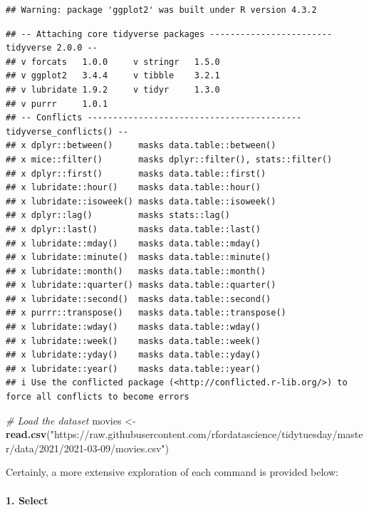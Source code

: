 \documentclass[
  b5paper]{book}
\newenvironment{Shaded}{\begin{snugshade}}{\end{snugshade}}
\newcommand{\CommentTok}[1]{\textcolor[rgb]{0.56,0.35,0.01}{\textit{#1}}}
\newcommand{\FunctionTok}[1]{\textcolor[rgb]{0.13,0.29,0.53}{\textbf{#1}}}
\newcommand{\NormalTok}[1]{#1}
\newcommand{\OtherTok}[1]{\textcolor[rgb]{0.56,0.35,0.01}{#1}}
\newcommand{\StringTok}[1]{\textcolor[rgb]{0.31,0.60,0.02}{#1}}
\begin{document}
\begin{verbatim}
## Warning: package 'ggplot2' was built under R version 4.3.2
\end{verbatim}

\begin{verbatim}
## -- Attaching core tidyverse packages ------------------------ tidyverse 2.0.0 --
## v forcats   1.0.0     v stringr   1.5.0
## v ggplot2   3.4.4     v tibble    3.2.1
## v lubridate 1.9.2     v tidyr     1.3.0
## v purrr     1.0.1     
## -- Conflicts ------------------------------------------ tidyverse_conflicts() --
## x dplyr::between()     masks data.table::between()
## x mice::filter()       masks dplyr::filter(), stats::filter()
## x dplyr::first()       masks data.table::first()
## x lubridate::hour()    masks data.table::hour()
## x lubridate::isoweek() masks data.table::isoweek()
## x dplyr::lag()         masks stats::lag()
## x dplyr::last()        masks data.table::last()
## x lubridate::mday()    masks data.table::mday()
## x lubridate::minute()  masks data.table::minute()
## x lubridate::month()   masks data.table::month()
## x lubridate::quarter() masks data.table::quarter()
## x lubridate::second()  masks data.table::second()
## x purrr::transpose()   masks data.table::transpose()
## x lubridate::wday()    masks data.table::wday()
## x lubridate::week()    masks data.table::week()
## x lubridate::yday()    masks data.table::yday()
## x lubridate::year()    masks data.table::year()
## i Use the conflicted package (<http://conflicted.r-lib.org/>) to force all conflicts to become errors
\end{verbatim}

\begin{Shaded}
\begin{Highlighting}[]
\CommentTok{\# Load the dataset}
\NormalTok{movies }\OtherTok{\textless{}{-}} \FunctionTok{read.csv}\NormalTok{(}\StringTok{"https://raw.githubusercontent.com/rfordatascience/tidytuesday/master/data/2021/2021{-}03{-}09/movies.csv"}\NormalTok{)}
\end{Highlighting}
\end{Shaded}

Certainly, a more extensive exploration of each command is provided below:

\hypertarget{select}{%
\paragraph*{1. Select}\label{select}}
\end{document}
